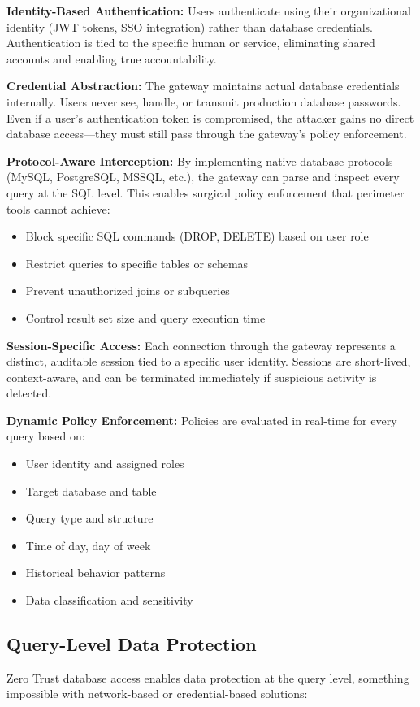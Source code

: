 \textbf{Identity-Based Authentication:} Users authenticate using their organizational identity (JWT tokens, SSO integration) rather than database credentials. Authentication is tied to the specific human or service, eliminating shared accounts and enabling true accountability.

\textbf{Credential Abstraction:} The gateway maintains actual database credentials internally. Users never see, handle, or transmit production database passwords. Even if a user's authentication token is compromised, the attacker gains no direct database access—they must still pass through the gateway's policy enforcement.

\textbf{Protocol-Aware Interception:} By implementing native database protocols (MySQL, PostgreSQL, MSSQL, etc.), the gateway can parse and inspect every query at the SQL level. This enables surgical policy enforcement that perimeter tools cannot achieve:
\begin{itemize}
    \item Block specific SQL commands (DROP, DELETE) based on user role
    \item Restrict queries to specific tables or schemas
    \item Prevent unauthorized joins or subqueries
    \item Control result set size and query execution time
\end{itemize}

\textbf{Session-Specific Access:} Each connection through the gateway represents a distinct, auditable session tied to a specific user identity. Sessions are short-lived, context-aware, and can be terminated immediately if suspicious activity is detected.

\textbf{Dynamic Policy Enforcement:} Policies are evaluated in real-time for every query based on:
\begin{itemize}
    \item User identity and assigned roles
    \item Target database and table
    \item Query type and structure
    \item Time of day, day of week
    \item Historical behavior patterns
    \item Data classification and sensitivity
\end{itemize}

\subsection{Query-Level Data Protection}
Zero Trust database access enables data protection at the query level, something impossible with network-based or credential-based solutions:

